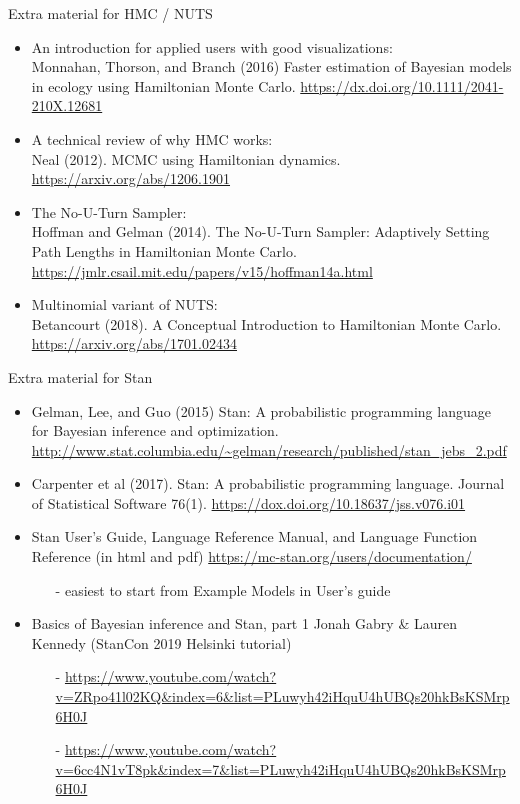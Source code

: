 \documentclass[finnish,english,t]{beamer}
\begin{document}
\begin{frame}{Extra material for HMC / NUTS}

  \begin{itemize}
  \item An introduction for applied users with good visualizations:\\
    Monnahan, Thorson, and Branch (2016)
    Faster estimation of Bayesian models in ecology using Hamiltonian
    Monte Carlo. \url{https://dx.doi.org/10.1111/2041-210X.12681}
  \item A technical review of why HMC works:\\
    Neal (2012). MCMC using Hamiltonian
    dynamics. \url{https://arxiv.org/abs/1206.1901}
  \item The No-U-Turn Sampler:\\
    Hoffman and Gelman (2014). The No-U-Turn
    Sampler: Adaptively Setting Path Lengths in Hamiltonian Monte
    Carlo. \url{https://jmlr.csail.mit.edu/papers/v15/hoffman14a.html}
  \item Multinomial variant of NUTS:\\
    Betancourt (2018).  A Conceptual Introduction to
    Hamiltonian Monte Carlo. \url{https://arxiv.org/abs/1701.02434}
  \end{itemize}

\end{frame}


\begin{frame}{Extra material for Stan}

  \begin{itemize}
  \item Gelman, Lee, and Guo (2015) Stan: A
    probabilistic programming language for Bayesian inference and
    optimization. \url{http://www.stat.columbia.edu/~gelman/research/published/stan_jebs_2.pdf}
  \item Carpenter et al (2017). Stan: A probabilistic programming
    language. Journal of Statistical Software
    76(1). \url{https://dox.doi.org/10.18637/jss.v076.i01}
  \item Stan User's Guide, Language Reference Manual, and Language
    Function Reference (in html and pdf)
    \url{https://mc-stan.org/users/documentation/}
    \begin{itemize}
    \item[-] easiest to start from Example Models in User's guide
    \end{itemize}
  \item Basics of Bayesian inference and Stan, part 1 Jonah Gabry \&
    Lauren Kennedy (StanCon 2019 Helsinki tutorial)
    \begin{itemize}
    \item[-]
      \url{https://www.youtube.com/watch?v=ZRpo41l02KQ&index=6&list=PLuwyh42iHquU4hUBQs20hkBsKSMrp6H0J}
    \item[-] \url{https://www.youtube.com/watch?v=6cc4N1vT8pk&index=7&list=PLuwyh42iHquU4hUBQs20hkBsKSMrp6H0J}
  \end{itemize}
  \end{itemize}
\end{frame}
\end{document}
